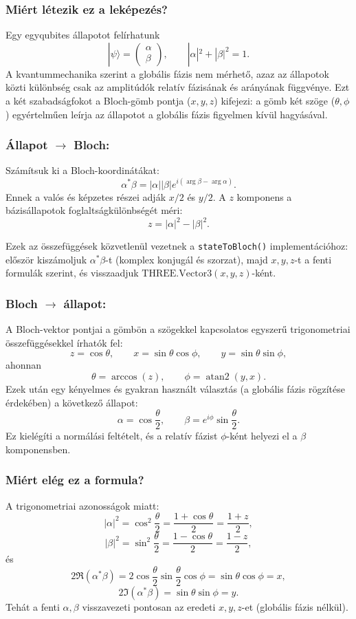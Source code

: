 \documentclass[12pt]{article}
\begin{document}
	\subsubsection*{Miért létezik ez a leképezés?}
	Egy egyqubites állapotot felírhatunk
	\[
	|\psi\rangle=\begin{pmatrix}\alpha\\\beta\end{pmatrix},\qquad |\alpha|^2+|\beta|^2=1.
	\]
	A kvantummechanika szerint a globális fázis nem mérhető, azaz az állapotok közti különbség csak az amplitúdók relatív fázisának és arányának függvénye. Ezt a két szabadságfokot a Bloch-gömb pontja (\(x,y,z\)) kifejezi: a gömb két szöge (\(\theta,\phi\)) egyértelműen leírja az állapotot a globális fázis figyelmen kívül hagyásával.
	
	\subsubsection*{Állapot \(\rightarrow\) Bloch:}
	Számítsuk ki a Bloch-koordinátákat:
	\[
	\alpha^\ast\beta = |\alpha||\beta| e^{i(\arg\beta-\arg\alpha)}.
	\]
	Ennek a valós és képzetes részei adják \(x/2\) és \(y/2\). A \(z\) komponens a bázisállapotok foglaltságkülönbségét méri:
	\[
	z = |\alpha|^2 - |\beta|^2.
	\]
	
	Ezek az összefüggések közvetlenül vezetnek a \texttt{stateToBloch()} implementációhoz: először kiszámoljuk \(\alpha^\ast\beta\)-t (komplex konjugál és szorzat), majd \(x,y,z\)-t a fenti formulák szerint, és visszaadjuk \(\mathrm{THREE.Vector3}(x,y,z)\)-ként.
	
	\subsubsection*{Bloch \(\rightarrow\) állapot:}
	A Bloch-vektor pontjai a gömbön a szögekkel kapcsolatos egyszerű trigonometriai összefüggésekkel írhatók fel:
	\[
	z=\cos\theta,\qquad x=\sin\theta\cos\phi,\qquad y=\sin\theta\sin\phi,
	\]
	ahonnan
	\[
	\theta=\arccos(z),\qquad \phi=\operatorname{atan2}(y,x).
	\]
	Ezek után egy kényelmes és gyakran használt választás (a globális fázis rögzítése érdekében) a következő állapot:
	\[
	\alpha=\cos\frac{\theta}{2},\qquad
	\beta=e^{i\phi}\sin\frac{\theta}{2}.
	\]
	Ez kielégíti a normálási feltételt, és a relatív fázist \(\phi\)-ként helyezi el a \(\beta\) komponensben.
	
	\subsubsection*{Miért elég ez a formula?}
	A trigonometriai azonosságok miatt:
	\[
	|\alpha|^2 = \cos^2\frac{\theta}{2} = \frac{1+\cos\theta}{2} = \frac{1+z}{2},
	\]
	\[
	|\beta|^2 = \sin^2\frac{\theta}{2} = \frac{1-\cos\theta}{2} = \frac{1-z}{2},
	\]
	és
	\[
	2\Re(\alpha^\ast\beta)=2\cos\frac{\theta}{2}\sin\frac{\theta}{2}\cos\phi = \sin\theta\cos\phi = x,
	\]
	\[
	2\Im(\alpha^\ast\beta)=\sin\theta\sin\phi = y.
	\]
	Tehát a fenti \(\alpha,\beta\) visszavezeti pontosan az eredeti \(x,y,z\)-et (globális fázis nélkül).
	
\end{document}
